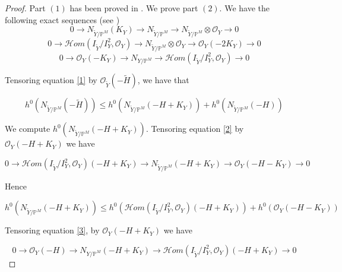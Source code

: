 \documentclass[11pt,twoside]{amsart}
\theoremstyle{plain}
\numberwithin{equation}{section}
\theoremstyle{definition}
\begin{document}
\begin{proof}
    Part $(1)$ has been proved in \cite[Theorem $2.2$]{BM24}. We prove part $(2)$. We have the following exact sequences (see \cite[Lemma $4.1$]{GGP08})
\begin{equation}\label{1}
    0 \to N_{\widetilde{Y}/\mathbb{P}^M} (K_Y) \to N_{\widetilde{Y}/\mathbb{P}^M} \to N_{\widetilde{Y}/\mathbb{P}^M} \otimes \mathcal{O}_Y \to 0
\end{equation}
\begin{equation}\label{2}
    0 \to \mathcal{H}om(I_{\widetilde{Y}}/I_{Y}^2, \mathcal{O}_Y) \to N_{\widetilde{Y}/\mathbb{P}^M} \otimes \mathcal{O}_Y \to \mathcal{O}_Y(-2K_Y) \to 0 
\end{equation}
\begin{equation}\label{3}
    0 \to \mathcal{O}_Y(-K_Y) \to N_{Y/\mathbb{P}^M} \to \mathcal{H}om(I_{\widetilde{Y}}/I_{Y}^2, \mathcal{O}_Y) \to 0
\end{equation}


Tensoring equation \ref{1} by $\mathcal{O}_{\widetilde{Y}}(-\widetilde{H})$, we have that 

\begin{equation}\label{4}
 h^0(N_{\widetilde{Y}/\mathbb{P}^M}(-\widetilde{H})) \leq h^0(N_{\widetilde{Y}/\mathbb{P}^M}(-H+K_Y)) + h^0(N_{\widetilde{Y}/\mathbb{P}^M}(-H))
\end{equation}

We compute $h^0(N_{\widetilde{Y}/\mathbb{P}^M}(-H+K_Y))$. Tensoring equation \ref{2} by $\mathcal{O}_Y(-H+K_Y)$ we have 

\begin{equation*}
    0 \to \mathcal{H}om(I_{\widetilde{Y}}/I_{Y}^2, \mathcal{O}_Y)(-H+K_Y) \to N_{\widetilde{Y}/\mathbb{P}^M}(-H+K_Y) \to \mathcal{O}_Y(-H-K_Y) \to 0 
\end{equation*}

Hence 

\begin{equation}\label{6}
    h^0(N_{\widetilde{Y}/\mathbb{P}^M}(-H+K_Y)) \leq h^0(\mathcal{H}om(I_{\widetilde{Y}}/I_{Y}^2, \mathcal{O}_Y)(-H+K_Y)) + h^0(\mathcal{O}_Y(-H-K_Y))
\end{equation}

Tensoring equation \ref{3}, by $\mathcal{O}_Y(-H+K_Y)$ we have 

\begin{equation*}
    0 \to \mathcal{O}_Y(-H) \to N_{Y/\mathbb{P}^M}(-H+K_Y) \to \mathcal{H}om(I_{\widetilde{Y}}/I_{Y}^2, \mathcal{O}_Y)(-H+K_Y) \to 0
\end{equation*}


\end{proof}
\end{document}
